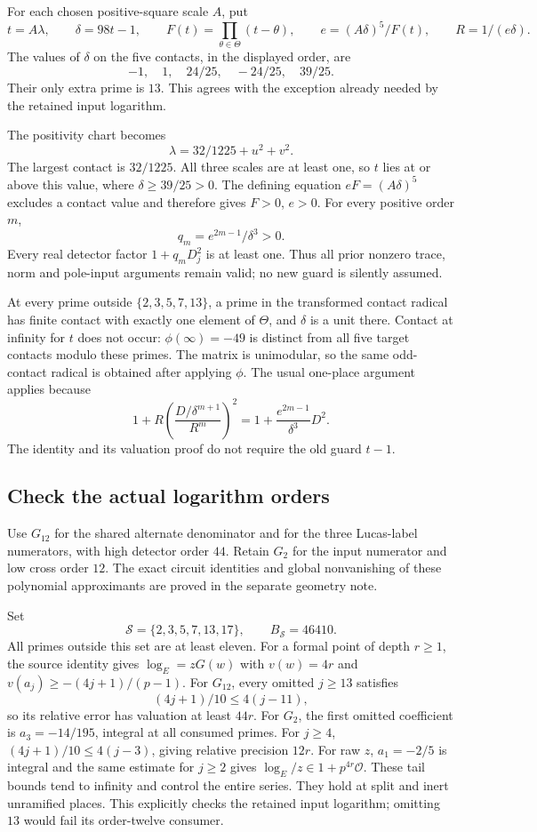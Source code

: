 For each chosen positive-square scale $A$, put
\[
 t=A\lambda,\qquad\delta=98t-1,\qquad
 F(t)=\prod_{\theta\in\Theta}(t-\theta),\qquad
 e=(A\delta)^5/F(t),\qquad R=1/(e\delta).
\]
The values of $\delta$ on the five contacts, in the displayed order, are
\[
 -1,\quad1,\quad24/25,\quad-24/25,\quad39/25.
\]
Their only extra prime is $13$. This agrees with the exception already
needed by the retained input logarithm.

The positivity chart becomes
\[
 \lambda=32/1225+u^2+v^2.
\]
The largest contact is $32/1225$. All three scales are at least one,
so $t$ lies at or above this value, where $\delta\ge39/25>0$.
The defining equation $eF=(A\delta)^5$ excludes a contact value and
therefore gives $F>0$, $e>0$. For every positive order $m$,
\[
 q_m=e^{2m-1}/\delta^3>0.
\]
Every real detector factor $1+q_mD_j^2$ is at least one. Thus all prior
nonzero trace, norm and pole-input arguments remain valid; no new guard
is silently assumed.

At every prime outside $\{2,3,5,7,13\}$, a prime in the transformed
contact radical has finite contact with exactly one element of $\Theta$,
and $\delta$ is a unit there. Contact at infinity for $t$ does not occur:
$\phi(\infty)=-49$ is distinct from all five target contacts modulo these
primes. The matrix is unimodular, so the same odd-contact radical is
obtained after applying $\phi$. The usual one-place argument applies
because
\[
 1+R\left(\frac{D/\delta^{m+1}}{R^m}\right)^2
       =1+\frac{e^{2m-1}}{\delta^3}D^2.
\]
The identity and its valuation proof do not require the old guard $t-1$.

\subsection{Check the actual logarithm orders}

Use $G_{12}$ for the shared alternate denominator and for the three
Lucas-label numerators, with high detector order $44$. Retain $G_2$
for the input numerator and low cross order $12$.
The exact circuit identities and global nonvanishing of these polynomial
approximants are proved in the separate geometry note.

Set
\[
 \mathcal S=\{2,3,5,7,13,17\},\qquad B_{\mathcal S}=46410.
\]
All primes outside this set are at least eleven. For a formal point
of depth $r\ge1$, the source identity gives $\log_E=zG(w)$ with
$v(w)=4r$ and $v(a_j)\ge-(4j+1)/(p-1)$.
For $G_{12}$, every omitted $j\ge13$ satisfies
\[
 (4j+1)/10\le4(j-11),
\]
so its relative error has valuation at least $44r$.
For $G_2$, the first omitted coefficient is
$a_3=-14/195$, integral at all consumed primes. For $j\ge4$,
$(4j+1)/10\le4(j-3)$, giving relative precision $12r$.
For raw $z$, $a_1=-2/5$ is integral and the same estimate for $j\ge2$
gives $\log_E/z\in1+p^{4r}\mathcal O$.
These tail bounds tend to infinity and control the entire series.
They hold at split and inert unramified places. This explicitly checks
the retained input logarithm; omitting $13$ would fail its order-twelve
consumer.

